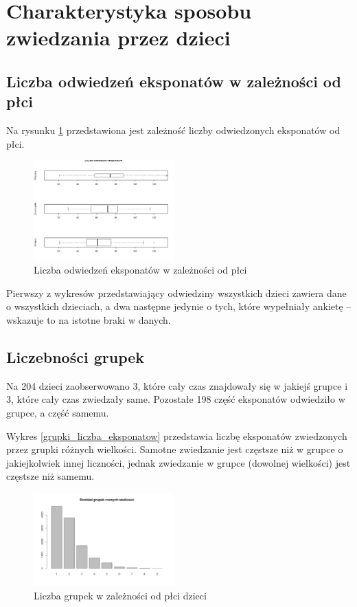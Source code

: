 \documentclass[conference]{IEEEtran}
\begin{document}
\section{Charakterystyka sposobu zwiedzania przez dzieci}
\subsection{Liczba odwiedzeń eksponatów w zależności od płci}
Na rysunku \ref{odwiedziny_plcie} przedstawiona jest zależność liczby odwiedzonych eksponatów od płci.
\begin{figure}[H]
\includegraphics[width=0.48\textwidth]{odwiedziny_plcie.png}
\caption{Liczba odwiedzeń eksponatów w zależności od płci}
\label{odwiedziny_plcie}
\end{figure}
Pierwszy z wykresów przedstawiający odwiedziny wszystkich dzieci zawiera dane o wszystkich dzieciach, a dwa następne jedynie o tych, które wypełniały ankietę -- wskazuje to na istotne braki w danych.

\subsection{Liczebności grupek}
Na 204 dzieci zaobserwowano 3, które cały czas znajdowały się w jakiejś grupce i 3, które cały czas zwiedzały same. Pozostałe 198 część eksponatów odwiedziło w grupce, a część samemu.

Wykres \ref{grupki_liczba_eksponatow} przedstawia liczbę eksponatów zwiedzonych przez grupki różnych wielkości. Samotne zwiedzanie jest częstsze niż w grupce o jakiejkolwiek innej liczności, jednak zwiedzanie w grupce (dowolnej wielkości) jest częstsze niż samemu.

\begin{figure}[H]
\includegraphics[width=0.48\textwidth]{grupki_liczba_eksponatow.png}
\caption{Liczba grupek w zależności od płci dzieci}
\label{grupki_plec}
\end{figure}
\end{document}
